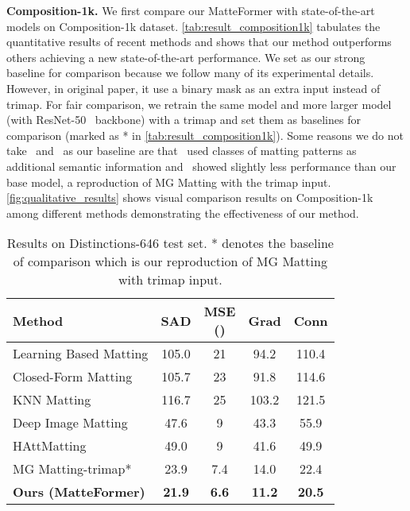 \documentclass[10pt,twocolumn,letterpaper]{article}
\begin{document}
\textbf{Composition-1k.}
We first compare our MatteFormer with state-of-the-art models on Composition-1k dataset. \cref{tab:result_composition1k} tabulates the quantitative results of recent methods and shows that our method outperforms others achieving a new state-of-the-art performance.
We set\cite{yu2021mask} as our strong baseline for comparison because we follow many of its experimental details. However, in original paper, it use a binary mask as an extra input instead of trimap. For fair comparison, we retrain the same model and more larger model (with ResNet-50~\cite{he2016deep} backbone) with a trimap and set them as baselines for comparison (marked as * in \cref{tab:result_composition1k}).
Some reasons we do not take~\cite{sun2021semantic} and~\cite{liu2021tripartite} as our baseline are that~\cite{sun2021semantic} used classes of matting patterns as additional semantic information and~\cite{liu2021tripartite} showed slightly less performance than our base model, a reproduction of MG Matting with the trimap input.
\cref{fig:qualitative_results} shows visual comparison results on Composition-1k among different methods demonstrating the effectiveness of our method.

\begin{table}[t!]
  \centering
   \begin{adjustbox}{width = \linewidth}
  \begin{tabular}{l | c c c c}
    \toprule
    Method & SAD & \makecell{MSE \\ ()} & Grad & Conn\\
    \midrule
    Learning Based Matting \cite{zheng2009learning} & 105.0 & 21 & 94.2 & 110.4 \\
    Closed-Form Matting  \cite{levin2007closed} & 105.7 & 23 & 91.8 & 114.6 \\
    KNN Matting \cite{chen2013knn} & 116.7 & 25 & 103.2 & 121.5 \\
    Deep Image Matting \cite{xu2017deep} & 47.6 & 9 & 43.3 & 55.9 \\
    HAttMatting \cite{qiao2020attention} & 49.0 & 9 & 41.6 & 49.9 \\
    \hline
    MG Matting-trimap* & 23.9 & 7.4 & 14.0 & 22.4 \\
    \bf{Ours (MatteFormer)} & \bf{21.9} & \bf{6.6} & \bf{11.2} & \bf{20.5} \\
    \bottomrule
  \end{tabular}
  \end{adjustbox}
  \caption{Results on Distinctions-646 test set. * denotes the baseline of comparison which is our reproduction of MG Matting with trimap input.}
  \label{tab:result_distinction646}
  \vspace{-2mm}
\end{table}
\end{document}
